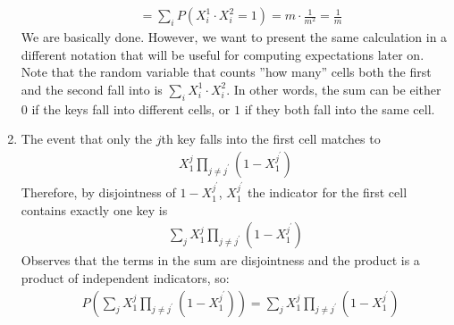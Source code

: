 \begin{example}
\begin{enumerate}
\begin{equation*}
\begin{split}
            &= \sum_{i}{P( X_{i}^1 \cdot X_{i}^{2} = 1)} = m\cdot \frac{1}{m^{2}} = \frac{1}{m}
          \end{split}
        \end{equation*} 
        We are basically done. However, we want to present the same calculation in a different notation that will be useful for computing expectations later on. Note that the random variable that counts ''how many'' cells both the first and the second fall into is $\sum_{i}{X_{i}^{1}\cdot X_{i}^{2} }$. In other words, the sum can be either $0$ if the keys fall into different cells, or $1$ if they both fall into the same cell.
      \item The event that only the $j$th key falls into the first cell matches to 
        \begin{equation*}
          \begin{split}
            X_{1}^{j}\prod_{j\neq j^{\prime}}\left( 1 - X_{1}^{j^{\prime}} \right)
          \end{split}
        \end{equation*}
        Therefore, by disjointness of $1-X_{1}^{j^{\prime}}$, $X_{1}^{j^{\prime}}$ the indicator for the first cell contains exactly one key is 
        \begin{equation*}
          \begin{split}
            \sum_{j}{X_{1}^{j}\prod_{j\neq j^{\prime}}\left( 1 - X_{1}^{j^{\prime}} \right)} 
          \end{split}
        \end{equation*} Observes that the terms in the sum are disjointness and the product is a product of independent indicators, so:
        \begin{equation*}
          \begin{split}
            & P\left(\sum_{j}{X_{1}^{j}\prod_{j\neq j^{\prime}}\left( 1 - X_{1}^{j^{\prime}} \right)} \right) = \sum_{j}{X_{1}^{j}\prod_{j\neq j^{\prime}}\left( 1 - X_{1}^{j^{\prime}} \right)}
          \end{split}
        \end{equation*}
    \end{enumerate}
  \end{example}

